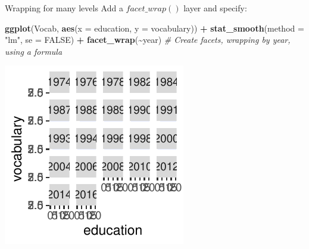 \documentclass[
  ignorenonframetext,
]{beamer}
\newenvironment{Shaded}{\begin{snugshade}}{\end{snugshade}}
\newcommand{\AttributeTok}[1]{\textcolor[rgb]{0.13,0.29,0.53}{#1}}
\newcommand{\CommentTok}[1]{\textcolor[rgb]{0.56,0.35,0.01}{\textit{#1}}}
\newcommand{\ConstantTok}[1]{\textcolor[rgb]{0.56,0.35,0.01}{#1}}
\newcommand{\FunctionTok}[1]{\textcolor[rgb]{0.13,0.29,0.53}{\textbf{#1}}}
\newcommand{\NormalTok}[1]{#1}
\newcommand{\SpecialCharTok}[1]{\textcolor[rgb]{0.81,0.36,0.00}{\textbf{#1}}}
\newcommand{\StringTok}[1]{\textcolor[rgb]{0.31,0.60,0.02}{#1}}
\begin{document}
\begin{frame}[fragile]{Wrapping for many levels}
\label{wrapping-for-many-levels-6}
Add a \(facet\_wrap()\) layer and specify:


\begin{Shaded}
\begin{Highlighting}[]
\FunctionTok{ggplot}\NormalTok{(Vocab, }\FunctionTok{aes}\NormalTok{(}\AttributeTok{x =}\NormalTok{ education, }\AttributeTok{y =}\NormalTok{ vocabulary)) }\SpecialCharTok{+} \FunctionTok{stat\_smooth}\NormalTok{(}\AttributeTok{method =} \StringTok{"lm"}\NormalTok{,}
    \AttributeTok{se =} \ConstantTok{FALSE}\NormalTok{) }\SpecialCharTok{+} \FunctionTok{facet\_wrap}\NormalTok{(}\SpecialCharTok{\textasciitilde{}}\NormalTok{year)  }\CommentTok{\# Create facets, wrapping by year, using a formula}
\end{Highlighting}
\end{Shaded}

\begin{center}\includegraphics[width=0.5\linewidth]{Figs/unnamed-chunk-96-1} \end{center}
\end{frame}
\end{document}
